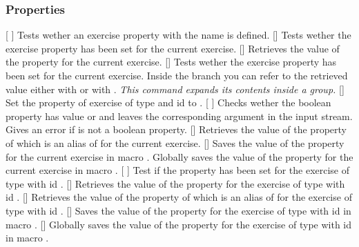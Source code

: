 \documentclass{xsim-manual}
\begin{document}
\subsubsection{Properties}
\begin{commands}
  \expandable{}[%
  ]
    Tests wether an exercise property with the name  is defined.
  []
    Tests wether the exercise property  has been set for the
    current exercise.
  \expandable{}[]
    Retrieves the value of the property  for the current
    exercise.
  []
    Tests wether the exercise property  has been set for the
    current exercise.  Inside the  branch you can refer to the
    retrieved value either with  or with .
    \emph{This command expands its contents inside a group.}
  []
    Set the property  of exercise of type  and id
     to .
  \expandable{}[%
    ]
    Checks wether the boolean property  has value 
    or  and leaves the corresponding argument in the input
    stream.  Gives an error if  is not a boolean property.
  \expandable{}[]
    Retrieves the value of the property of which  is an alias
    of for the current exercise.
  []
    Saves the value of the property  for the current
    exercise in macro .
    Globally saves the value of the property  for the current
    exercise in macro .
  [%
    ]
    Test if the property  has been set for the exercise of type
     with id .
  \expandable{}[]
    Retrieves the value of the property  for the exercise of type
     with id .
  \expandable{}[]
    Retrieves the value of the property of which  is an alias
    of for the exercise of type  with id .
  []
    Saves the value of the property  for the exercise of type
     with id  in macro .
  []
    Globally saves the value of the property  for the exercise
    of type  with id  in macro .
\end{commands}
\end{document}
